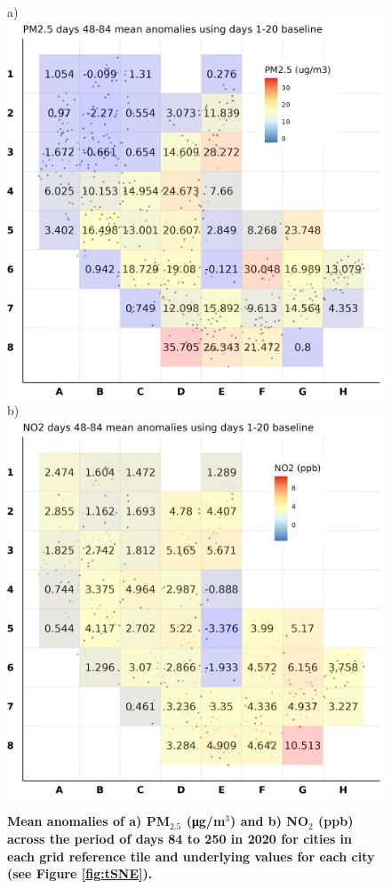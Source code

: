 \documentclass[preprint,10pt]{elsarticle} %
\begin{document}
\begin{figure}
\centering
a) \includegraphics[trim={0 0 0 0},clip,scale=0.43]{Images/City_Types_Dimension_chessboard_pm25anomalyDiff20.png}
b) \includegraphics[trim={0 0 0 0},clip,scale=0.43]{Images/City_Types_Dimension_chessboard_no2anomalyDiff20.png}
\caption{\bf Mean anomalies of a) PM$_{2.5}$ (\si{\micro\gram}/m$^{3}$) and b) NO$_{2}$ (ppb) across the period of days 84 to 250 in 2020 for cities in each grid reference tile and underlying values for each city (see Figure \ref{fig:tSNE}).}  
 \label{fig:Heatmap250NO2}\label{fig:Heatmap250PM}
\end{figure}
\end{document}
